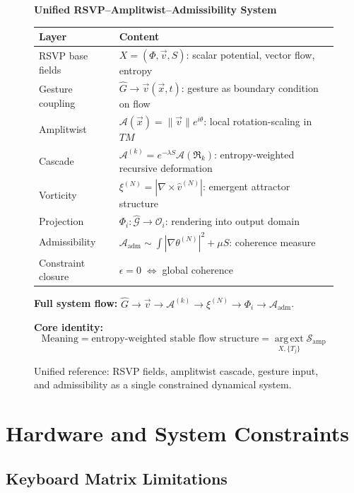 \documentclass[11pt, a4paper]{article}
\begin{document}
\begin{figure}[H]
\centering
\small
\begin{minipage}{0.95\textwidth}
\textbf{Unified RSVP--Amplitwist--Admissibility System}
\medskip

\begin{tabular}{@{}p{3.8cm}p{9.6cm}@{}}
\toprule
\textbf{Layer} & \textbf{Content} \\
\midrule
RSVP base fields & $X=(\Phi,\vec{v},S)$: scalar potential, vector flow, entropy \\
Gesture coupling & $\hat{G}\to\vec{v}(\vec{x},t)$: gesture as boundary condition on flow \\
Amplitwist & $\mathcal{A}(\vec{x})=\|\vec{v}\|e^{i\theta}$: local rotation-scaling in $TM$ \\
Cascade & $\mathcal{A}^{(k)}=e^{-\lambda S}\mathcal{A}(\mathfrak{R}_k)$: entropy-weighted recursive deformation \\
Vorticity & $\xi^{(N)}=|\nabla\times\hat{v}^{(N)}|$: emergent attractor structure \\
Projection & $\Phi_i:\hat{\mathcal{G}}\to\mathcal{O}_i$: rendering into output domain \\
Admissibility & $\mathcal{A}_{\mathrm{adm}}\sim\int|\nabla\theta^{(N)}|^2+\mu S$: coherence measure \\
Constraint closure & $\epsilon=0\;\Longleftrightarrow\;$global coherence \\
\bottomrule
\end{tabular}

\medskip
\textbf{Full system flow:}
$\hat{G}\to\vec{v}\to\mathcal{A}^{(k)}\to\xi^{(N)}\to\Phi_i\to\mathcal{A}_{\mathrm{adm}}$.

\medskip
\textbf{Core identity:}
\[
  \text{Meaning}
  = \text{entropy-weighted stable flow structure}
  = \operatorname*{arg\,ext}_{X,\{T_j\}}\mathcal{S}_{\mathrm{amp}}
\]
\end{minipage}
\caption{Unified reference: RSVP fields, amplitwist cascade, gesture input, and admissibility
as a single constrained dynamical system.}
\label{fig:cheat-unified}
\end{figure}

\section{Hardware and System Constraints}

\subsection{Keyboard Matrix Limitations}
\end{document}
